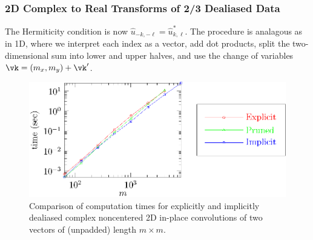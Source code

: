 \documentclass[final]{siamltex}
\def\ee{\end{dmath*}}
\def\bec{\begin{dmath*}[compact]}
\def\no{\hiderel}
\begin{document}
\subsubsection{2D Complex to Real Transforms of 2/3 Dealiased Data}
The Hermiticity condition is now $\hat{u}_{-k,-\ell}=\hat{u}^*_{k,\ell}$.
The procedure is analagous as in 1D,
where we interpret each index as a vector, add dot products,
split the two-dimensional sum into lower and upper halves, and use the
change of variables $\vk=(m_x,m_y)+\vk'$.

\begin{figure}[htbp]
  \begin{center}
    \includegraphics{timing2c}
    \caption{Comparison of computation times for explicitly and implicitly
dealiased complex noncentered 2D in-place convolutions of two vectors of
(unpadded) length $m\times m$.}
    \label{timing2c}
  \end{center}
\end{figure}
\end{document}
